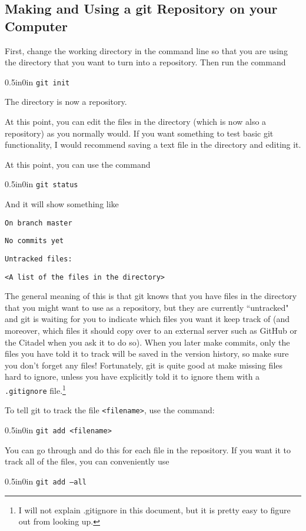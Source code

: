 \documentclass[11pt]{article}
\newcommand{\code}[1]{\begin{adjustwidth}{0.5in}{0in}
    \texttt{#1}
    \end{adjustwidth}}
\begin{document}
\subsection{Making and Using a git Repository on your Computer}

First, change the working directory in the command line so that you are using the directory that you want to turn into a repository.  Then run the command

\code{git init}

The directory is now a repository.

At this point, you can edit the files in the directory (which is now also a repository) as you normally would.  If you want something to test basic git functionality, I would recommend saving a text file in the directory and editing it.

At this point, you can use the command

\code{git status}

And it will show something like

\texttt{On branch master}

\texttt{No commits yet}

\texttt{Untracked files:}

\quad \texttt{<A list of the files in the directory>}

The general meaning of this is that git knows that you have files in the directory that you might want to use as a repository, but they are currently ``untracked" and git is waiting for you to indicate which files you want it keep track of (and moreover, which files it should copy over to an external server such as GitHub or the Citadel when you ask it to do so).  When you later make commits, only the files you have told it to track will be saved in the version history, so make sure you don't forget any files!  Fortunately, git is quite good at make missing files hard to ignore, unless you have explicitly told it to ignore them with a \texttt{.gitignore} file.\footnote{I will not explain .gitignore in this document, but it is pretty easy to figure out from looking up.}

To tell git to track the file \texttt{<filename>}, use the command:

\code{git add <filename>}

You can go through and do this for each file in the repository.  If you want it to track all of the files, you can conveniently use

\code{git add --all}
\end{document}
